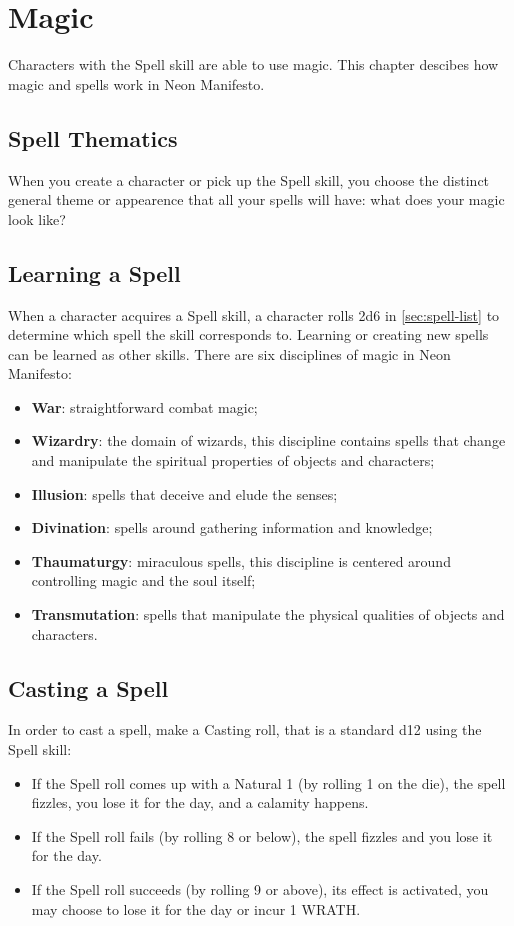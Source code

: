 \newpage
\section{Magic}
\label{sec:magic}

Characters with the Spell skill are able to use magic. This chapter descibes how magic and spells work in Neon Manifesto.

\subsection{Spell Thematics}
When you create a character or pick up the Spell skill, you choose the distinct general theme or appearence that all your spells will have: what does your magic look like?

\subsection{Learning a Spell}
When a character acquires a Spell skill, a character rolls 2d6 in \ref{sec:spell-list} to determine which spell the skill corresponds to. Learning or creating new spells can be learned as other skills. There are six disciplines of magic in Neon Manifesto:
\begin{itemize}
    \item {\textbf{War}: straightforward combat magic;}
    \item {\textbf{Wizardry}: the domain of wizards, this discipline contains spells that change and manipulate the spiritual properties of objects and characters;}
    \item {\textbf{Illusion}: spells that deceive and elude the senses;}
    \item {\textbf{Divination}: spells around gathering information and knowledge;}
    \item {\textbf{Thaumaturgy}: miraculous spells, this discipline is centered around controlling magic and the soul itself;}
    \item {\textbf{Transmutation}: spells that manipulate the physical qualities of objects and characters.}
\end{itemize}

\subsection{Casting a Spell}
In order to cast a spell, make a Casting roll, that is a standard d12 using the Spell skill:
\begin{itemize}
    \item If the Spell roll comes up with a Natural 1 (by rolling 1 on the die), the spell fizzles, you lose it for the day, and a calamity happens.
    \item If the Spell roll fails (by rolling 8 or below), the spell fizzles and you lose it for the day.
    \item If the Spell roll succeeds (by rolling 9 or above), its effect is activated, you may choose to lose it for the day or incur 1 WRATH.
\end{itemize}

